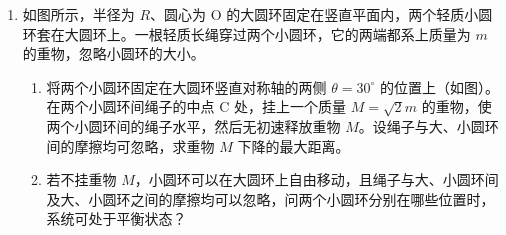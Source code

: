 \documentclass[\gkver]{gaokaozhenti}
\begin{document}
\begin{enumerate}
{\begin{enumerate}
	\item
	电压表接入前，电容器上的电压 $U_{C}$ 等于电阻 $R_{2}$ 上的电压，$R_{1}$ 两端的电压为 $U_{R_{1}}$，则 $\frac{U_{C}}{U_{R_{1}}}=\frac{R_{2}}{R_{1}}$，又 $E=U_{C}+U_{R_{1}}$。
	接入电压表后，电容器上的电压为 $U_{C}'=E-U_{1}$。
	由于电压表的接入，电容器带电量增加了 $\Delta Q=C(U_{C}'-U_{C})$。
	由以上各式解得 $\Delta Q=C\left(\frac{R_{1}E}{R_{1}+R_{2}}-U_{1}\right)$，代入数据解得 $\Delta Q=2.35\times 10^{-6}\UC$。
\end{enumerate}
}

\item
如图所示，半径为 $R$、圆心为 O 的大圆环固定在竖直平面内，两个轻质小圆环套在大圆环上。一根轻质长绳穿过两个小圆环，它的两端都系上质量为 $m$ 的重物，忽略小圆环的大小。
\begin{enumerate}
	\item
	将两个小圆环固定在大圆环竖直对称轴的两侧 $\theta=30^\circ$ 的位置上（如图）。在两个小圆环间绳子的中点 C 处，挂上一个质量 $M=\sqrt{2}m$ 的重物，使两个小圆环间的绳子水平，然后无初速释放重物 $M$。设绳子与大、小圆环间的摩擦均可忽略，求重物 $M$ 下降的最大距离。

	\item
	若不挂重物 $M$，小圆环可以在大圆环上自由移动，且绳子与大、小圆环间及大、小圆环之间的摩擦均可以忽略，问两个小圆环分别在哪些位置时，系统可处于平衡状态？
\end{enumerate}

\end{enumerate}
\end{document}
